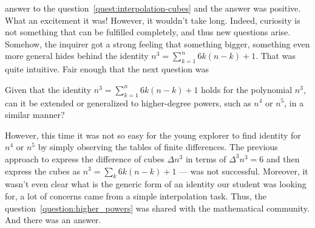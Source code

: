 answer to the question~\eqref{quest:interpolation-cubes} and the answer was positive.
What an excitement it was!
However, it wouldn't take long.
Indeed, curiosity is not something that can be fulfilled completely,
and thus new questions arise.
Somehow, the inquirer got a strong feeling that something bigger, something even more general
hides behind the identity $n^3 = \sum_{k=1}^{n} 6k(n-k) + 1$.
That was quite intuitive.
Fair enough that the next question was
\begin{question}
    Given that the identity $n^3 = \sum_{k=1}^{n} 6k(n-k) + 1$ holds for the polynomial $n^3$,
    can it be extended or generalized to higher-degree powers, such as $n^4$ or $n^5$,
    in a similar manner?
    \label{question:higher_powers}
\end{question}

However, this time it was not so easy for the young explorer to find identity for $n^4$ or $n^5$
by simply observing the tables of finite differences.
The previous approach to express the difference of cubes $\Delta n^3$ in terms of
$\Delta^3 n^3 = 6$ and then express the cubes as $n^3 = \sum_k 6k (n-k) +1$ --- was not successful.
Moreover, it wasn't even clear what is the generic form of an identity our student was looking for,
a lot of concerns came from a simple interpolation task.
Thus, the question~\eqref{question:higher_powers} was shared with the mathematical community.
And there was an answer.

